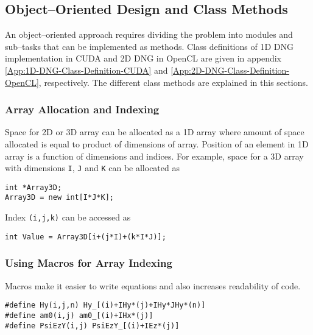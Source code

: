 \subsection{Object--Oriented Design and Class Methods}
An object--oriented approach requires dividing the problem into modules and sub--tasks that can be implemented as methods. Class definitions of 1D DNG implementation in CUDA and 2D DNG in OpenCL are given in appendix \ref{App:1D-DNG-Class-Definition-CUDA} and \ref{App:2D-DNG-Class-Definition-OpenCL}, respectively. The different class methods are explained in this sections.
\subsubsection{Array Allocation and Indexing}
Space for 2D or 3D array can be allocated as a 1D array where amount of space allocated is equal to product of dimensions of array. Position of an element in 1D array is a function of dimensions and indices. For example, space for a 3D array with dimensions \texttt{I}, \texttt{J} and \texttt{K} can be allocated as

\label{lst:3D-Array-Allocation}
\SingleSpacing
\begin{lstlisting}[caption={3D array allocation}]
int *Array3D;
Array3D = new int[I*J*K];
\end{lstlisting}
\DoubleSpacing
Index \texttt{(i,j,k)} can be accessed as

\label{lst:3D-Array-Access}
\SingleSpacing
\begin{lstlisting}[caption={Accessing elements of 3D array}]
int Value = Array3D[i+(j*I)+(k*I*J)];
\end{lstlisting}
\DoubleSpacing
\subsubsection{Using Macros for Array Indexing}
Macros make it easier to write equations and also increases readability of code.

\label{lst:Array-Access-Macro}
\SingleSpacing
\begin{lstlisting}[caption={Macro to access array elements}]
#define Hy(i,j,n) Hy_[(i)+IHy*(j)+IHy*JHy*(n)]
#define am0(i,j) am0_[(i)+IHx*(j)]
#define PsiEzY(i,j) PsiEzY_[(i)+IEz*(j)]
\end{lstlisting}
\DoubleSpacing
